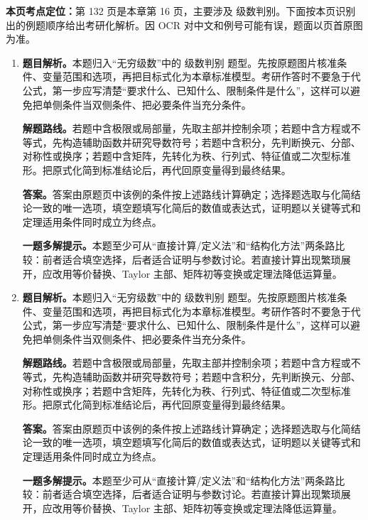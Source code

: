\begin{solutionblock}
\textbf{本页考点定位：}第 132 页是本章第 16 页，主要涉及 级数判别。下面按本页识别出的例题顺序给出考研化解析。因 OCR 对中文和例号可能有误，题面以页首原图为准。

\begin{enumerate}[label=\textbf{例\arabic*.}, leftmargin=2.4em]

\item \textbf{题目解析。}本题归入“无穷级数”中的 级数判别 题型。先按原题图片核准条件、变量范围和选项，再把目标式化为本章标准模型。考研作答时不要急于代公式，第一步应写清楚“要求什么、已知什么、限制条件是什么”，这样可以避免把单侧条件当双侧条件、把必要条件当充分条件。

\textbf{解题路线。}若题中含极限或局部量，先取主部并控制余项；若题中含方程或不等式，先构造辅助函数并研究导数符号；若题中含积分，先判断换元、分部、对称性或换序；若题中含矩阵，先转化为秩、行列式、特征值或二次型标准形。把原式化简到标准结论后，再代回原变量得到最终结果。

\textbf{答案。}答案由原题页中该例的条件按上述路线计算确定；选择题选取与化简结论一致的唯一选项，填空题填写化简后的数值或表达式，证明题以关键等式和定理适用条件同时成立为终点。

\textbf{一题多解提示。}本题至少可从“直接计算/定义法”和“结构化方法”两条路比较：前者适合填空选择，后者适合证明与参数讨论。若直接计算出现繁琐展开，应改用等价替换、Taylor 主部、矩阵初等变换或定理法降低运算量。

\item \textbf{题目解析。}本题归入“无穷级数”中的 级数判别 题型。先按原题图片核准条件、变量范围和选项，再把目标式化为本章标准模型。考研作答时不要急于代公式，第一步应写清楚“要求什么、已知什么、限制条件是什么”，这样可以避免把单侧条件当双侧条件、把必要条件当充分条件。

\textbf{解题路线。}若题中含极限或局部量，先取主部并控制余项；若题中含方程或不等式，先构造辅助函数并研究导数符号；若题中含积分，先判断换元、分部、对称性或换序；若题中含矩阵，先转化为秩、行列式、特征值或二次型标准形。把原式化简到标准结论后，再代回原变量得到最终结果。

\textbf{答案。}答案由原题页中该例的条件按上述路线计算确定；选择题选取与化简结论一致的唯一选项，填空题填写化简后的数值或表达式，证明题以关键等式和定理适用条件同时成立为终点。

\textbf{一题多解提示。}本题至少可从“直接计算/定义法”和“结构化方法”两条路比较：前者适合填空选择，后者适合证明与参数讨论。若直接计算出现繁琐展开，应改用等价替换、Taylor 主部、矩阵初等变换或定理法降低运算量。

\end{enumerate}
\end{solutionblock}


